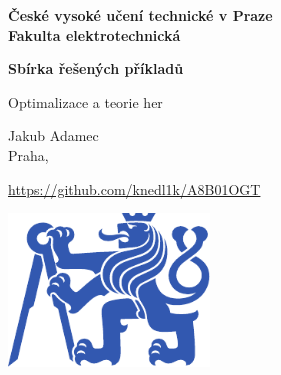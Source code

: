 \documentclass[11pt,a4paper]{article}
\begin{document}
 

\begin{titlepage}
    \centering
    \vspace*{2cm}

    {\Large \textbf{České vysoké učení technické v Praze}\\}
    \vspace{0.2cm}
    {\Large \textbf{Fakulta elektrotechnická}\\}
    
    \vspace{1cm}
    {\Huge \textbf{Sbírka řešených příkladů}\\}

    \vspace{0.5cm}
    {\Large Optimalizace a teorie her\\}

    \vspace{2cm}
    { Jakub Adamec\\}
    { Praha, \the\year\\}

    \vspace{2cm}
    { \url{https://github.com/knedl1k/A8B01OGT}}

    \vspace{2cm}
    \includegraphics[width=0.4\textwidth]{media/symbol_cvut_plna_samostatna_verze_Pantone.pdf}

    \vfill
    
\end{titlepage}

\clearpage
{}
\setcounter{page}{1}

\tableofcontents
{}

\clearpage
{}
\setcounter{page}{1} 





 
\end{document}
